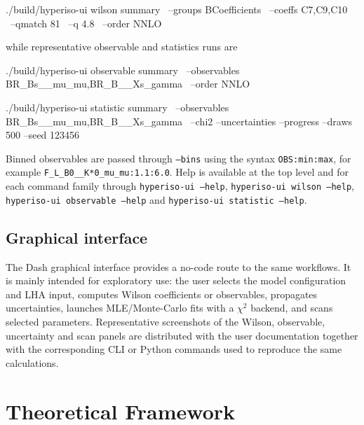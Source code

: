 \documentclass[preprint,11pt]{elsarticle}
\begin{document}
\begin{terminal}
./build/hyperiso-ui wilson summary \
  --groups BCoefficients \
  --coeffs C7,C9,C10 \
  --qmatch 81 \
  --q 4.8 \
  --order NNLO
\end{terminal}

while representative observable and statistics runs are

\begin{terminal}
./build/hyperiso-ui observable summary \
  --observables BR_Bs__mu_mu,BR_B__Xs_gamma \
  --order NNLO

./build/hyperiso-ui statistic summary \
  --observables BR_Bs__mu_mu,BR_B__Xs_gamma \
  --chi2 --uncertainties --progress --draws 500 --seed 123456
\end{terminal}

Binned observables are passed through \texttt{--bins} using the syntax \texttt{OBS:min:max}, for example \texttt{F\_L\_B0\_\_K*0\_mu\_mu:1.1:6.0}. Help is available at the top level and for each command family through \texttt{hyperiso-ui --help}, \texttt{hyperiso-ui wilson --help}, \texttt{hyperiso-ui observable --help} and \texttt{hyperiso-ui statistic --help}.

\subsection{Graphical interface}

The Dash graphical interface provides a no-code route to the same workflows. It is mainly intended for exploratory use: the user selects the model configuration and LHA input, computes Wilson coefficients or observables, propagates uncertainties, launches MLE/Monte-Carlo fits with a $\chi^2$ backend, and scans selected parameters. Representative screenshots of the Wilson, observable, uncertainty and scan panels are distributed with the user documentation together with the corresponding CLI or Python commands used to reproduce the same calculations.


\section{Theoretical Framework}
\end{document}
